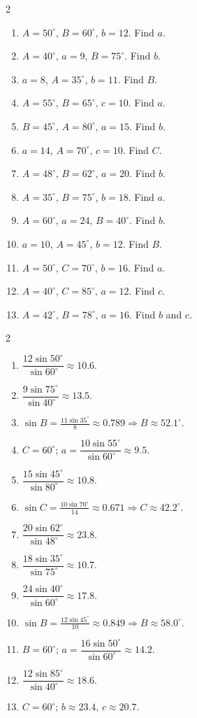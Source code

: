 \documentclass[11pt]{article}
\begin{document}
\begin{recapbox}
\begin{multicols}{2}
\small
\begin{enumerate}[leftmargin=*,itemsep=3pt]
  \item $A=50^\circ$, $B=60^\circ$, $b=12$. Find $a$.
  \item $A=40^\circ$, $a=9$, $B=75^\circ$. Find $b$.
  \item $a=8$, $A=35^\circ$, $b=11$. Find $B$.
  \item $A=55^\circ$, $B=65^\circ$, $c=10$. Find $a$.
  \item $B=45^\circ$, $A=80^\circ$, $a=15$. Find $b$.
  \item $a=14$, $A=70^\circ$, $c=10$. Find $C$.
  \item $A=48^\circ$, $B=62^\circ$, $a=20$. Find $b$.
  \item $A=35^\circ$, $B=75^\circ$, $b=18$. Find $a$.
  \item $A=60^\circ$, $a=24$, $B=40^\circ$. Find $b$.
  \item $a=10$, $A=45^\circ$, $b=12$. Find $B$.
  \item $A=50^\circ$, $C=70^\circ$, $b=16$. Find $a$.
  \item $A=40^\circ$, $C=85^\circ$, $a=12$. Find $c$.
  \item $A=42^\circ$, $B=78^\circ$, $a=16$. Find $b$ and $c$.
\end{enumerate}
\end{multicols}
\end{recapbox}

\begin{keybox}
\begin{multicols}{2}
\small
\begin{enumerate}[leftmargin=*,itemsep=3pt]
  \item $\dfrac{12\sin50^\circ}{\sin60^\circ}\approx10.6$.
  \item $\dfrac{9\sin75^\circ}{\sin40^\circ}\approx13.5$.
  \item $\sin B=\tfrac{11\sin35^\circ}{8}\approx0.789\Rightarrow B\approx52.1^\circ$.
  \item $C=60^\circ$; $a=\dfrac{10\sin55^\circ}{\sin60^\circ}\approx9.5$.
  \item $\dfrac{15\sin45^\circ}{\sin80^\circ}\approx10.8$.
  \item $\sin C=\tfrac{10\sin70^\circ}{14}\approx0.671\Rightarrow C\approx42.2^\circ$.
  \item $\dfrac{20\sin62^\circ}{\sin48^\circ}\approx23.8$.
  \item $\dfrac{18\sin35^\circ}{\sin75^\circ}\approx10.7$.
  \item $\dfrac{24\sin40^\circ}{\sin60^\circ}\approx17.8$.
  \item $\sin B=\tfrac{12\sin45^\circ}{10}\approx0.849\Rightarrow B\approx58.0^\circ$.
  \item $B=60^\circ$; $a=\dfrac{16\sin50^\circ}{\sin60^\circ}\approx14.2$.
  \item $\dfrac{12\sin85^\circ}{\sin40^\circ}\approx18.6$.
  \item $C=60^\circ$; $b\approx23.4$, $c\approx20.7$.
\end{enumerate}
\end{multicols}
\end{keybox}
\end{document}
